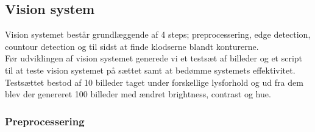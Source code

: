 \subsection{Vision system}
Vision systemet består grundlæggende af 4 steps; preprocessering, edge detection, countour detection og til sidst at finde klodserne blandt konturerne. \\

Før udviklingen af vision systemet generede vi et testsæt af billeder og et script til at teste vision systemet på sættet samt at bedømme systemets effektivitet.
Testsættet bestod af 10 billeder taget under forskellige lysforhold og ud fra dem blev der genereret 100 billeder med ændret brightness, contrast og hue. \\

\subsubsection{Preprocessering}
